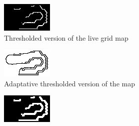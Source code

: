 \documentclass[../main.tex]{subfiles}
\begin{document}
\begin{figure}[H]
	\centering
	\begin{subfigure}[b]{0.45\textwidth}
		\centering
		\includegraphics[width=\textwidth]{IMAGES/part3/treshold_image.png}
		\caption{Thresholded version of the live grid map}
		\label{fig:subfigure1}
	\end{subfigure}
	\hfill
	\begin{subfigure}[b]{0.45\textwidth}
		\centering
		\includegraphics[width=\textwidth]{IMAGES/part3/adaptative_treshold.png}
		\caption{Adaptative thresholded version of the map}
		\label{fig:subfigure2}
	\end{subfigure}
	\vfill
	\begin{subfigure}[b]{0.45\textwidth}
		\centering
		\includegraphics[width=\textwidth]{IMAGES/part3/dilatation_image.png}

\end{subfigure}
\end{figure}
\end{document}
